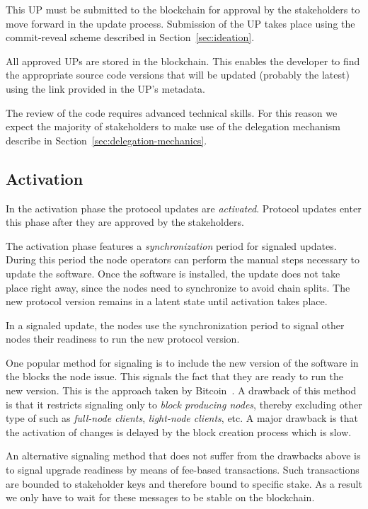 \documentclass[11pt,a4paper]{article}
\begin{document}
This UP must be submitted to the blockchain for approval by the stakeholders to
move forward in the update process. Submission of the UP takes place using the
commit-reveal scheme described in Section~\ref{sec:ideation}.


All approved UPs are stored in the blockchain. This enables the developer to
find the appropriate source code versions that will be updated (probably the
latest) using the link provided in the UP's metadata.

The review of the code requires advanced technical skills. For this reason we
expect the majority of stakeholders to make use of the delegation mechanism
describe in Section~\ref{sec:delegation-mechanics}.

\subsection{Activation}
\label{sec:activation}

In the activation phase the protocol updates are \emph{activated}. Protocol
updates enter this phase after they are approved by the stakeholders.

The activation phase features a \emph{synchronization} period for signaled
updates. During this period the node operators can perform the manual steps
necessary to update the software. Once the software is installed, the update
does not take place right away, since the nodes need to synchronize to avoid
chain splits. The new protocol version remains in a latent state until
activation takes place.

In a signaled update, the nodes use the synchronization period to signal other
nodes their readiness to run the new protocol version.

One popular method for signaling is to include the new version of the software
in the blocks the node issue. This signals the fact that they are ready to run
the new version. This is the approach taken by Bitcoin~\cite{bitcoin}. A
drawback of this method is that it restricts signaling only to \emph{block
  producing nodes}, thereby excluding other type of such as \emph{full-node
  clients}, \emph{light-node clients}, etc. A major drawback is that the
activation of changes is delayed by the block creation process which is slow.

An alternative signaling method that does not suffer from the drawbacks above is
to signal upgrade readiness by means of fee-based transactions. Such
transactions are bounded to stakeholder keys and therefore bound to specific
stake.
%
As a result we only have to wait for these messages to be stable on the
blockchain.
\end{document}
